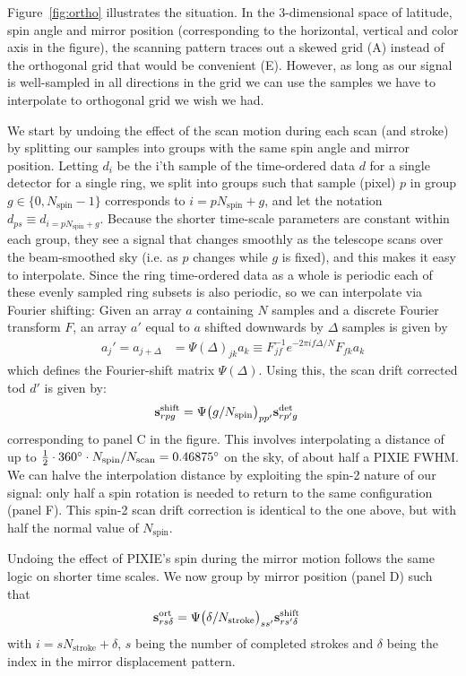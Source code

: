 \documentclass{article}
\renewcommand{\vec}[1]{{\bf #1}}
\begin{document}
Figure~\ref{fig:ortho} illustrates the situation. In the 3-dimensional
space of latitude, spin angle and mirror position (corresponding to the
horizontal, vertical and color axis in the figure), the scanning pattern
traces out a skewed grid (A) instead of the orthogonal grid
that would be convenient (E). However, as long as our signal is well-sampled
in all directions in the grid we can use the samples we have to
interpolate to orthogonal grid we wish we had.

We start by undoing the effect of the scan motion during each scan (and stroke)
by splitting our samples into groups with the same spin angle and mirror position.
Letting $d_i$ be the i'th sample of the time-ordered data $d$ for a single detector
for a single ring, we split into groups such that
sample (pixel) $p$ in group $g \in \{0,N_\textrm{spin}-1\}$ corresponds to
$i = pN_\textrm{spin}+g$, and let the notation $d_{ps} \equiv d_{i=pN_\textrm{spin}+g}$.
Because the shorter time-scale parameters are constant within each group, they see
a signal that changes smoothly as the telescope scans over the beam-smoothed sky
(i.e. as $p$ changes while $g$ is fixed),
and this makes it easy to interpolate. Since the ring time-ordered data as a whole
is periodic each of these evenly sampled ring subsets is also periodic, so we
can interpolate via Fourier shifting: Given an array $a$ containing $N$ samples and a discrete Fourier transform $F$,
an array $a'$ equal to $a$ shifted downwards by $\Delta$ samples is given by
\begin{align}
	a_j' = a_{j+\Delta} &= \Psi(\Delta)_{jk} a_k \equiv F^{-1}_{jf} e^{-2\pi if\Delta/N} F_{fk} a_k
\end{align}
which defines the Fourier-shift matrix $\Psi(\Delta)$. Using this,
the scan drift corrected tod $d'$ is given by:
\begin{align}
	\vec s^\textrm{shift}_{rpg} &= \Psi\big(g/N_\textrm{spin}\big)_{pp'} \vec s^\textrm{det}_{rp'g}
\end{align}
corresponding to panel C in the figure. This involves interpolating
a distance of up to $\frac12\cdot 360\degree\cdot N_\textrm{spin}/N_\textrm{scan}
= 0.46875\degree$ on the sky, of about half a PIXIE FWHM. We can halve the
interpolation distance by exploiting the spin-2 nature of our signal:
only half a spin rotation is needed to return to the same configuration (panel F).
This spin-2 scan drift correction is identical to the one above, but with
half the normal value of $N_\textrm{spin}$.

Undoing the effect of PIXIE's spin during the mirror motion follows the same
logic on shorter time scales. We now group by mirror position (panel D)
such that
\begin{align}
	\vec s^\textrm{ort}_{rs\delta} &= \Psi\big(\delta/N_\textrm{stroke}\big)_{ss'} \vec s^\textrm{shift}_{rs'\delta}
\end{align}
with $i = sN_\textrm{stroke}+\delta$, $s$ being the number of completed strokes
and $\delta$ being the index in the mirror displacement pattern.
\end{document}
